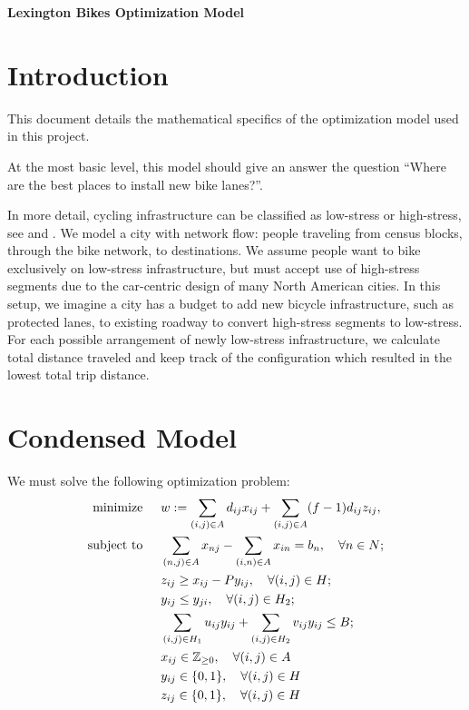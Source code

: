\documentclass[12pt,letterpaper]{article}
\newcommand{\Z}{\mathbb{Z}}
\begin{document}
\begin{center}
	{\Large{\bf Lexington Bikes Optimization Model}}
\end{center}

\section{Introduction} 

This document details the mathematical specifics of the optimization model used in this project. 

At the most basic level, this model should give an answer the question ``Where are the best places to install new bike lanes?''. 

In more detail, cycling infrastructure can be classified as low-stress or high-stress, see \cite{mti} and \cite{pfb}. 
We model a city with network flow: people traveling from census blocks, through the bike network, to destinations. 
We assume people want to bike exclusively on low-stress infrastructure, but must accept use of high-stress segments due to the car-centric design of many North American cities. 
In this setup, we imagine a city has a budget to add new bicycle infrastructure, such as protected lanes, to existing roadway to convert high-stress segments to low-stress. 
For each possible arrangement of newly low-stress infrastructure, we calculate total distance traveled and keep track of the configuration which resulted in the lowest total trip distance. 

\section{Condensed Model}

We must solve the following optimization problem: 
\begin{align}
    \text{minimize} \hspace{0.5cm}& w := \sum_{(i,j)\in A} d_{ij}x_{ij}+ \sum_{(i,j)\in A} (f-1)d_{ij}z_{ij},\label{eq:objective}\\
    \text{subject to} \hspace{0.5cm}& \sum_{(n,j)\in A} x_{nj} - \sum_{(i,n)\in A} x_{in} = b_n, \quad \forall n \in N; \label{eq:netflow}\\
    & z_{ij}\geq x_{ij}-Py_{ij} , \quad\forall (i,j)\in H; \label{eq:stress-logic}\\
    & y_{ij} \leq y_{ji}, \quad\forall (i,j)\in H_2; \label{bi-directional upgrades} \\
    & \sum_{(i,j)\in H_1} u_{ij}y_{ij} + \sum_{(i,j)\in H_2} v_{ij}y_{ij}\leq B; \label{eq:budget} \\
    & x_{ij} \in \Z_{\geq 0}, \quad\forall (i,j) \in A \label{eq:integral_x} \\
    & y_{ij} \in \{0,1\}, \quad \forall (i,j) \in H \label{eq:binary_y} \\
    & z_{ij} \in \{0,1\}, \quad \forall (i,j) \in H \label{eq:binary_z}
\end{align}
\end{document}
